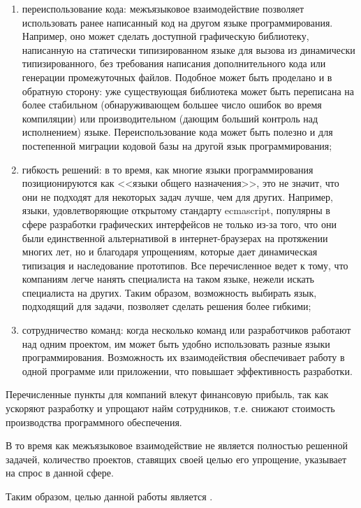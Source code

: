 \documentclass[times
]{itmo-student-thesis}
\begin{document}
\begin{enumerate}
\item переиспользование кода: межъязыковое взаимодействие позволяет использовать ранее написанный код на другом языке программирования. Например, оно может сделать доступной графическую библиотеку, написанную на статически типизированном языке для вызова из динамически типизированного, без требования написания дополнительного кода или генерации промежуточных файлов. Подобное может быть проделано и в обратную сторону: уже существующая библиотека может быть переписана на более стабильном (обнаруживающем большее число ошибок во время компиляции) или производительном (дающим больший контроль над исполнением) языке. Переиспользование кода может быть полезно и для постепенной миграции кодовой базы на другой язык программирования;

\item гибкость решений: в то время, как многие языки программирования позиционируются как <<языки общего назначения>>, это не значит, что они не подходят для некоторых задач лучше, чем для других. Например, языки, удовлетворяющие открытому стандарту ecmascript, популярны в сфере разработки графических интерфейсов не только из-за того, что они были единственной альтернативой в интернет-браузерах на протяжении многих лет, но и благодаря упрощениям, которые дает динамическая типизация и наследование прототипов. Все перечисленное ведет к тому, что компаниям легче нанять специалиста на таком языке, нежели искать специалиста на других. Таким образом, возможность выбирать язык, подходящий для задачи, позволяет сделать решения более гибкими;

\item сотрудничество команд: когда несколько команд или разработчиков работают над одним проектом, им может быть удобно использовать разные языки программирования. Возможность их взаимодействия обеспечивает работу в одной программе или приложении, что повышает эффективность разработки.
\end{enumerate}

Перечисленные пункты для компаний влекут финансовую прибыль, так как ускоряют разработку и упрощают найм сотрудников, т.е. снижают стоимость производства программного обеспечения.

В то время как межъязыковое взаимодействие не является полностью решенной задачей, количество проектов, ставящих своей целью его упрощение, указывает на спрос в данной сфере.

Таким образом, целью данной работы является \MakeLowercase\MyResearchAim.
\end{document}

